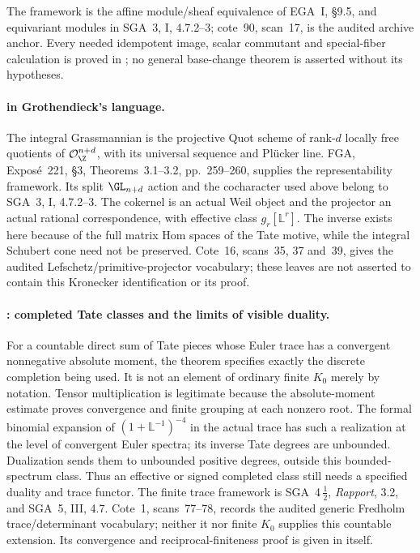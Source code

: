 The framework is the affine module/sheaf equivalence of EGA~I,
\S9.5, and equivariant modules in SGA~3, I, 4.7.2--3; cote~90,
scan~17, is the audited archive anchor. Every needed idempotent
image, scalar commutant and special-fiber calculation is proved
in ; no general base-change theorem is asserted without
its hypotheses.

\paragraph{ in Grothendieck's language.}
The integral Grassmannian is the projective Quot scheme of
rank-$d$ locally free quotients of $\mathcal O_{\Z}^{n+d}$,
with its universal sequence and Pl\"ucker line. FGA, Expos\'e~221,
\S3, Theorems~3.1--3.2, pp.~259--260, supplies the representability
framework. Its split $\GL_{n+d}$ action and the cocharacter used
above belong to SGA~3, I, 4.7.2--3. The cokernel is an actual
Weil object and the projector an actual rational correspondence,
with effective class $g_r[\mathbb L^r]$. The inverse exists here
because of the full matrix Hom spaces of the Tate motive, while
the integral Schubert cone need not be preserved. Cote~16,
scans~35, 37 and~39, gives the audited Lefschetz/primitive-projector
vocabulary; these leaves are not asserted to contain this
Kronecker identification or its proof.


\paragraph{: completed Tate classes and the limits of visible duality.}
For a countable direct sum of Tate pieces whose Euler trace has a
convergent nonnegative absolute moment, the theorem specifies exactly
the discrete completion being used. It is not an element of ordinary
finite $K_0$ merely by notation. Tensor multiplication is legitimate
because the absolute-moment estimate proves convergence and finite
grouping at each nonzero root. The formal binomial expansion of
$(1+\mathbb L^{-1})^{-4}$ in the actual trace has such a realization
at the level of convergent Euler spectra; its inverse Tate degrees
are unbounded. Dualization sends them to unbounded positive degrees,
outside this bounded-spectrum class. Thus an effective or signed
completed class still needs a specified duality and trace functor.
The finite trace framework is SGA~4\,$\frac12$, \emph{Rapport},
3.2, and SGA~5, III, 4.7. Cote~1, scans~77--78, records the
audited generic Fredholm trace/determinant vocabulary; neither it
nor finite $K_0$ supplies this countable extension. Its convergence
and reciprocal-finiteness proof is given in  itself.

